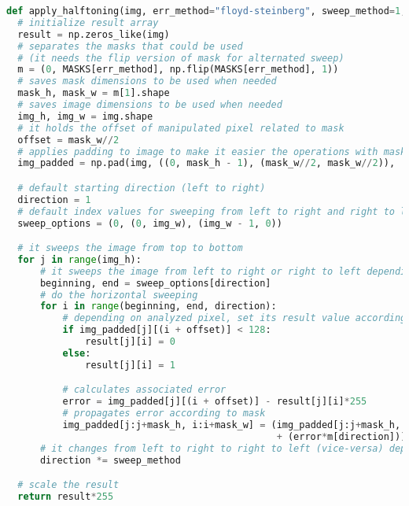 \documentclass[]{IEEEtran}
\begin{document}
\begin{lstlisting}[language=Python, caption={Implementation of halftoning solution}, label={code:halftoning}]
def apply_halftoning(img, err_method="floyd-steinberg", sweep_method=1, benchmarking=False):
  # initialize result array
  result = np.zeros_like(img)
  # separates the masks that could be used
  # (it needs the flip version of mask for alternated sweep)
  m = (0, MASKS[err_method], np.flip(MASKS[err_method], 1))
  # saves mask dimensions to be used when needed
  mask_h, mask_w = m[1].shape
  # saves image dimensions to be used when needed
  img_h, img_w = img.shape
  # it holds the offset of manipulated pixel related to mask
  offset = mask_w//2
  # applies padding to image to make it easier the operations with mask
  img_padded = np.pad(img, ((0, mask_h - 1), (mask_w//2, mask_w//2)), 'constant')

  # default starting direction (left to right)
  direction = 1
  # default index values for sweeping from left to right and right to left
  sweep_options = (0, (0, img_w), (img_w - 1, 0))

  # it sweeps the image from top to bottom
  for j in range(img_h):
      # it sweeps the image from left to right or right to left depending on direction
      beginning, end = sweep_options[direction]
      # do the horizontal sweeping
      for i in range(beginning, end, direction):
          # depending on analyzed pixel, set its result value according to threshold
          if img_padded[j][(i + offset)] < 128:
              result[j][i] = 0
          else:
              result[j][i] = 1

          # calculates associated error
          error = img_padded[j][(i + offset)] - result[j][i]*255
          # propagates error according to mask
          img_padded[j:j+mask_h, i:i+mask_w] = (img_padded[j:j+mask_h, i:i+mask_w]
                                                + (error*m[direction])).astype(np.uint8)
      # it changes from left to right to right to left (vice-versa) depending on the sweep method
      direction *= sweep_method

  # scale the result
  return result*255

\end{lstlisting}
\end{document}
